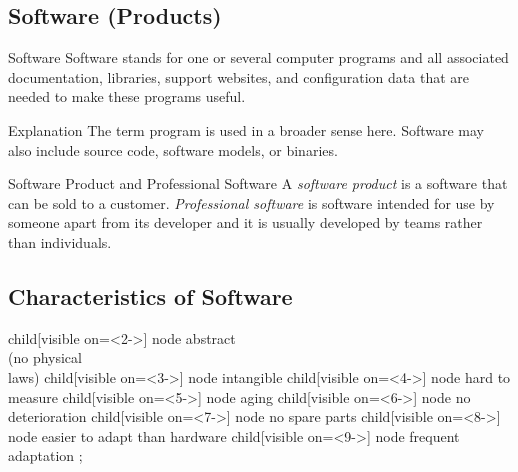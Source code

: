 
\subsection{Software (Products)}
\begin{frame}{\insertsubsection}
	\begin{fancycolumns}
		\begin{definition}{Software }
			Software stands for one or several computer programs and all associated documentation, libraries, support websites, and configuration data that are needed to make these programs useful.
		\end{definition}
		\begin{example}{Explanation}
			The term program is used in a broader sense here. Software may also include source code, software models, or binaries.
		\end{example}
	\nextcolumn
		\begin{definition}{Software Product and Professional Software}
			A \emph{software product} is a software that can be sold to a customer. \emph{Professional software} is software intended for use by someone apart from its developer and it is usually developed by teams rather than individuals. 
		\end{definition}
	\end{fancycolumns}
\end{frame}

\subsection{Characteristics of Software}
\begin{frame}{\insertsubsection}
	\centering\tikz[grow cyclic,
	mindmap, every node/.style=concept,concept color=red!10!background,
	level 1/.append style={level distance=27mm,sibling angle=360/8}]
	child[visible on={<2->}] { node {abstract\\(no physical\\laws)} }
	child[visible on={<3->}] { node {intangible } }
	child[visible on={<4->}] { node {hard to measure} }
	child[visible on={<5->}] { node {aging} }
	child[visible on={<6->}] { node {no \phantom{abc}deterioration} }
	child[visible on={<7->}] { node {no spare parts} }
	child[visible on={<8->}] { node {easier to adapt than hardware} }
	child[visible on={<9->}] { node {frequent adaptation\phantom{;}} }
	;
\end{frame}

